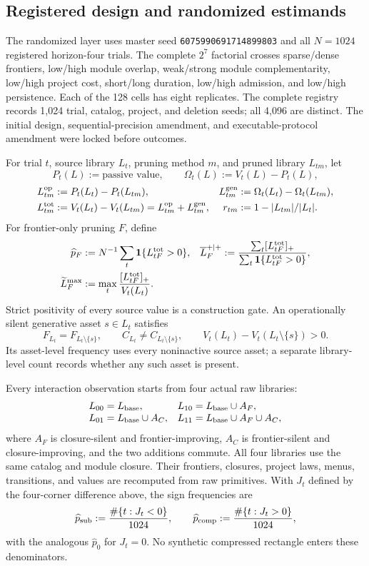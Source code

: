 \subsection{Registered design and randomized estimands}
\label{sec:supp-randomized-estimands}

The randomized layer uses master seed
\texttt{6075990691714899803} and all \(N=1024\) registered horizon-four
trials.  The complete \(2^7\) factorial crosses sparse/dense frontiers,
low/high module overlap, weak/strong module complementarity, low/high project
cost, short/long duration, low/high admission, and low/high persistence.  Each
of the 128 cells has eight replicates.  The complete registry records 1,024
trial, catalog, project, and deletion seeds; all 4,096 are distinct.  The
initial design, sequential-precision amendment, and executable-protocol
amendment were locked before outcomes.

For trial \(t\), source library \(L_t\), pruning method \(m\), and pruned
library \(L_{tm}\), let
\[
 P_t(L):=\text{passive value},\qquad
 \Omega_t(L):=V_t(L)-P_t(L),
\]
\[
\begin{aligned}
 L^{\rm op}_{tm}&:=P_t(L_t)-P_t(L_{tm}),&
 L^{\rm gen}_{tm}&:=\Omega_t(L_t)-\Omega_t(L_{tm}),\\
 L^{\rm tot}_{tm}&:=V_t(L_t)-V_t(L_{tm})
                  =L^{\rm op}_{tm}+L^{\rm gen}_{tm},&
 r_{tm}&:=1-|L_{tm}|/|L_t|.
\end{aligned}
\]
For frontier-only pruning \(F\), define
\[
\begin{aligned}
 \widehat p_F&:=N^{-1}\sum_t\mathbf 1\{L^{\rm tot}_{tF}>0\},&
 \overline L_F^{+\mid+}
   &:=\frac{\sum_t[L^{\rm tot}_{tF}]_+}
            {\sum_t\mathbf 1\{L^{\rm tot}_{tF}>0\}},\\
 \widetilde L_F^{\max}
   &:=\max_t\frac{[L^{\rm tot}_{tF}]_+}{V_t(L_t)} .
\end{aligned}
\]
Strict positivity of every source value is a construction gate.  An
operationally silent generative asset \(s\in L_t\) satisfies
\[
 F_{L_t}=F_{L_t\setminus\{s\}},\qquad
 C_{L_t}\ne C_{L_t\setminus\{s\}},\qquad
 V_t(L_t)-V_t(L_t\setminus\{s\})>0 .
\]
Its asset-level frequency uses every noninactive source asset; a separate
library-level count records whether any such asset is present.

Every interaction observation starts from four actual raw libraries:
\[
\begin{array}{ll}
 L_{00}=L_{\rm base},&
 L_{10}=L_{\rm base}\cup A_F,\\
 L_{01}=L_{\rm base}\cup A_C,&
 L_{11}=L_{\rm base}\cup A_F\cup A_C,
\end{array}
\]
where \(A_F\) is closure-silent and frontier-improving, \(A_C\) is
frontier-silent and closure-improving, and the two additions commute.  All
four libraries use the same catalog and module closure.  Their frontiers,
closures, project laws, menus, transitions, and values are recomputed from raw
primitives.  With \(J_t\) defined by the four-corner difference above, the
sign frequencies are
\[
 \widehat p_{\rm sub}:=
 \frac{\#\{t:J_t<0\}}{1024},\qquad
 \widehat p_{\rm comp}:=
 \frac{\#\{t:J_t>0\}}{1024},
\]
with the analogous \(\widehat p_0\) for \(J_t=0\).  No synthetic compressed
rectangle enters these denominators.

